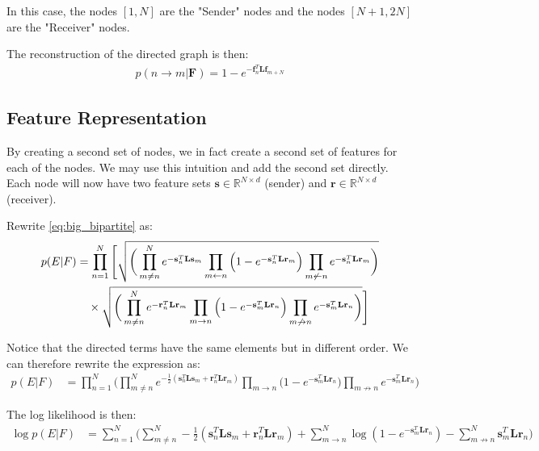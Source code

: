 \documentclass{article}
\begin{document}
In this case, the nodes $[1,N]$ are the "Sender" nodes and the nodes $[N+1,2N]$ are the "Receiver" nodes.

The reconstruction of the directed graph is then:
\begin{align}
    p(n\rightarrow m|\mathbf{F}) = 1 - e^{-\mathbf{f}_n^T \mathbf{L} \mathbf{f}_{m + N}}
\end{align}

\subsection{Feature Representation}
By creating a second set of nodes, we in fact create a second set of features for each of the nodes. We may use this intuition and add the second set directly. Each node will now have two feature sets $\mathbf{s} \in \mathbb{R}^{N \times d}$ (sender) and $\mathbf{r} \in \mathbb{R}^{N \times d}$ (receiver).

Rewrite \ref{eq:big_bipartite} as:
\begin{align}
    p(E|F) &= \prod_{n=1}^{N} \Bigg[\sqrt{
    \bigg(
    \prod_{m\not=n}^{N}e^{-\mathbf{s}_n^T \mathbf{L} \mathbf{s}_m} 
    \prod_{m \leftarrow n}\Big(1-e^{-\mathbf{s}_n^T \mathbf{L} \mathbf{r}_m}\Big)
    \prod_{m \not\leftarrow n}e^{-\mathbf{s}_n^T \mathbf{L} \mathbf{r}_m}
    \bigg)} \notag \\
    &\quad \times \sqrt{\bigg(
        \prod_{m\not=n}^{N}e^{-\mathbf{r}_n^T \mathbf{L} \mathbf{r}_m} 
        \prod_{m \rightarrow n}\Big(1-e^{-\mathbf{s}_m^T \mathbf{L} \mathbf{r}_n}\Big)
        \prod_{m \not\rightarrow n}e^{-\mathbf{s}_m^T \mathbf{L} \mathbf{r}_n}
        \bigg)
    }\Bigg]
\end{align}

Notice that the directed terms have the same elements but in different order. We can therefore rewrite the expression as:
\begin{align}
    p(E|F) &= \prod_{n=1}^{N} \Bigg(
        \prod_{m\not=n}^{N}e^{-\frac{1}{2}(\mathbf{s}_n^T \mathbf{L} \mathbf{s}_m + \mathbf{r}_n^T \mathbf{L} \mathbf{r}_m)}
        \prod_{m \rightarrow n}\Big(1-e^{-\mathbf{s}_m^T \mathbf{L} \mathbf{r}_n}\Big)
        \prod_{m \not\rightarrow n}e^{-\mathbf{s}_m^T \mathbf{L} \mathbf{r}_n}
    \Bigg)
\end{align}
 
The log likelihood is then:
\begin{align}
    \log p(E|F) &= \sum_{n=1}^{N} \Bigg(
        \sum_{m\not=n}^{N} -\frac{1}{2}(\mathbf{s}_n^T \mathbf{L} \mathbf{s}_m + \mathbf{r}_n^T \mathbf{L} \mathbf{r}_m) +
        \sum_{m \rightarrow n}^{N} \log(1-e^{-\mathbf{s}_m^T \mathbf{L} \mathbf{r}_n}) -
        \sum_{m \not\rightarrow n}^{N} \mathbf{s}_m^T \mathbf{L} \mathbf{r}_n
    \Bigg)
\end{align}
\end{document}
